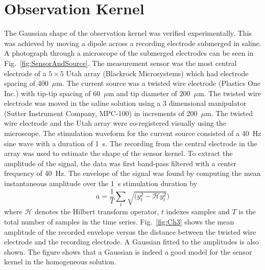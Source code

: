 \documentclass[review,authoryear,3p]{elsarticle}
\begin{document}
\section{Observation Kernel}\label{App:ObsKernelExperiment}
The Gaussian shape of the observation kernel was verified experimentally. This was achieved by moving a dipole across a recording electrode submerged in saline. A photograph through a microscope of the submerged electrodes can be seen in Fig.~\ref{fig:SensorAndSource}. The measurement sensor was the most central electrode of a $5\times5$ Utah array (Blackrock Microsystems) which had electrode spacing of 400~$\mu$m. The current source was a twisted wire electrode (Plastics One Inc.) with tip-tip spacing of 60~$\mu$m and tip diameter of 200~$\mu$m. The twisted wire electrode was moved in the saline solution using a 3 dimensional manipulator (Sutter Instrument Company, MPC-100) in increments of 200~$\mu$m. The twisted wire electrode and the Utah array were co-registered visually using the microscope.
The stimulation waveform for the current source consisted of a 40~Hz sine wave with a duration of 1~s. The recording from the central electrode in the array was used to estimate the shape of the sensor kernel. To extract the amplitude of the signal, the data was first band-pass filtered with a center frequency of 40~Hz. The envelope of the signal was found by computing the mean instantaneous amplitude over the 1~s stimulation duration by
\begin{equation}
	a = \frac{1}{T}\sum_t{\sqrt{(y_t^2-\mathcal{H}y_t^2})}
\end{equation}
where $\mathcal{H}$ denotes the Hilbert transform operator, $t$ indexes samples and $T$ is the total number of samples in the time series. Fig.~\ref{fig:Ch3} shows the mean amplitude of the recorded envelope versus the distance between the twisted wire electrode and the recording electrode. A Gaussian fitted to the amplitudes is also shown. The figure shows that a Gaussian is indeed a good model for the sensor kernel in the homogeneous solution.
\end{document}
